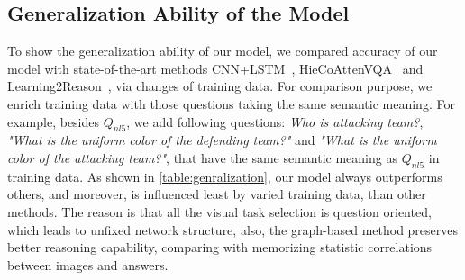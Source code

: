 

\subsection{Generalization Ability of the Model}

To show the generalization ability of our model, we compared accuracy of our model with state-of-the-art methods CNN+LSTM~\cite{VQA}, HieCoAttenVQA~\cite{Lu2016Hie} and Learning2Reason~\cite{hu2017learning}, via changes of training data. For comparison purpose, we enrich training data with those questions taking the same semantic meaning. For example, besides $Q_{nl5}$, we add following questions: \textit{Who is attacking team?}, \textit{"What is the uniform color of the defending team?"} and \textit{"What is the uniform color of the attacking team?"}, that have the same semantic meaning as $Q_{nl5}$ in training data. As shown in \cref{table:genralization}, our model always outperforms others, and moreover, is influenced least by varied training data, than other methods. The reason is that all the visual task selection is question oriented, which leads to unfixed network structure, also, the graph-based method preserves better reasoning capability, comparing with memorizing statistic correlations between images and answers.



